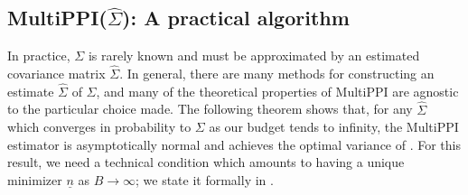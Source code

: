 \documentclass{article} %
\newcommand{\Ex}{\mathbb{E}}
\newcommand{\charlie}[1]{ {\color{red}[CCB: #1]}}
\newcommand{\jacob}[1]{ {\color{blue}[JE: #1]}}
\newcommand{\wh}[1]{\widehat{#1}}
\newcommand{\ul}[1]{\underline{#1}}
\begin{document}





\subsection{MultiPPI($\widehat{\Sigma}$): A practical algorithm}\label{sec:practical}


In practice, $\Sigma$ is rarely known and must be approximated by an estimated covariance matrix $\wh{\Sigma}$. In general, there are many methods for constructing an estimate $\wh{\Sigma}$ of $\Sigma$, and many of the theoretical properties of MultiPPI are agnostic to the particular choice made. The following theorem shows that, for any $\wh{\Sigma}$ which converges in probability to $\Sigma$ as our budget tends to infinity, the MultiPPI estimator is asymptotically normal and achieves the optimal variance of . For this result, we need a technical condition which amounts to  having a unique minimizer $\ul{n}$ as $B\to\infty$; we state it formally in .
\end{document}
